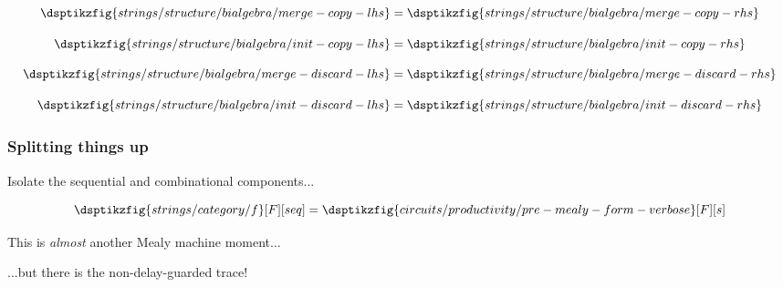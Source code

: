 \begin{frame}
\begin{axiom}
        \begin{minipage}{0.28\textwidth}
            \begin{equation*}
                \dsptikzfig{strings/structure/bialgebra/merge-copy-lhs}
                =
                \dsptikzfig{strings/structure/bialgebra/merge-copy-rhs}
            \end{equation*}
        \end{minipage}
        \begin{minipage}{0.23\textwidth}
            \begin{equation*}
                \dsptikzfig{strings/structure/bialgebra/init-copy-lhs}
                =
                \dsptikzfig{strings/structure/bialgebra/init-copy-rhs}
            \end{equation*}
        \end{minipage}
        \begin{minipage}{0.23\textwidth}
            \begin{equation*}
                \dsptikzfig{strings/structure/bialgebra/merge-discard-lhs}
                =
                \dsptikzfig{strings/structure/bialgebra/merge-discard-rhs}
            \end{equation*}
        \end{minipage}
        \begin{minipage}{0.2\textwidth}
            \begin{equation*}
                \dsptikzfig{strings/structure/bialgebra/init-discard-lhs}
                =
                \dsptikzfig{strings/structure/bialgebra/init-discard-rhs}
            \end{equation*}
        \end{minipage}
    \end{axiom}
\end{frame}
\begin{frame}
    \frametitle{Splitting things up}

    \centering

    \alert{Isolate} the sequential and combinational components...

    \wait
    \[
        \dsptikzfig{strings/category/f}[F][seq]
        =
        \dsptikzfig{circuits/productivity/pre-mealy-form-verbose}[F][s]
    \]

    \wait
    This is \emph{almost} another Mealy machine moment...

    \wait
    ...but there is the non-delay-guarded trace!
\end{frame}
